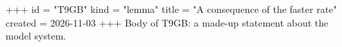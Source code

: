 +++
id = "T9GB"
kind = "lemma"
title = "A consequence of the faster rate"
created = 2026-11-03
+++
Body of T9GB: a made-up statement about the model system.
